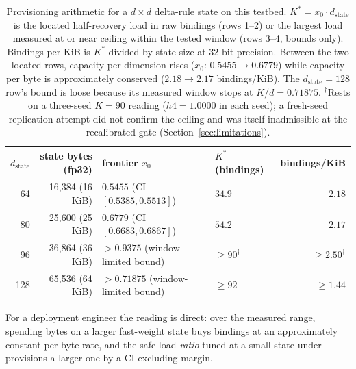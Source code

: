 \begin{table}[t]
  \centering
  \small
  \setlength{\tabcolsep}{4.5pt}
  \begin{tabular}{rrllr}
    \toprule
    $d_{\mathrm{state}}$ & state bytes (fp32) & frontier $x_0$ & $K^{*}$ (bindings) & bindings/KiB \\
    \midrule
    64  & 16{,}384 (16 KiB) & $0.5455$ (CI $[0.5385, 0.5513]$) & $34.9$ & $2.18$ \\
    80  & 25{,}600 (25 KiB) & $0.6779$ (CI $[0.6683, 0.6867]$) & $54.2$ & $2.17$ \\
    96  & 36{,}864 (36 KiB) & $> 0.9375$ (window-limited bound) & $\ge 90^{\dagger}$ & $\ge 2.50^{\dagger}$ \\
    128 & 65{,}536 (64 KiB) & $> 0.71875$ (window-limited bound) & $\ge 92$ & $\ge 1.44$ \\
    \bottomrule
  \end{tabular}
  \caption{Provisioning arithmetic for a $d \times d$ delta-rule state on
  this testbed. $K^{*} = x_0 \cdot d_{\mathrm{state}}$ is the located
  half-recovery load in raw bindings (rows 1--2) %
  or the largest load measured at or near ceiling within the tested
  window (rows 3--4, bounds only). %
  Bindings per KiB is $K^{*}$ divided by state size at 32-bit precision.
  Between the two located rows, capacity per dimension rises
  ($x_0$: $0.5455 \to 0.6779$) while capacity per byte is approximately
  conserved ($2.18 \to 2.17$ bindings/KiB). %
  The $d_{\mathrm{state}}=128$ row's bound is loose because its measured
  window stops at $K/d = 0.71875$. $^{\dagger}$Rests on a three-seed
  $K{=}90$ reading ($h4 = 1.0000$ in each seed); a fresh-seed
  replication attempt did not confirm the ceiling and was itself
  inadmissible at the recalibrated gate
  (Section~\ref{sec:limitations}).}
  \label{tab:bytes}
\end{table}

For a deployment engineer the reading is direct: over the measured range,
spending bytes on a larger fast-weight state buys bindings at an
approximately constant per-byte rate, and the safe load \emph{ratio}
tuned at a small state under-provisions a larger one by a CI-excluding
margin. %
